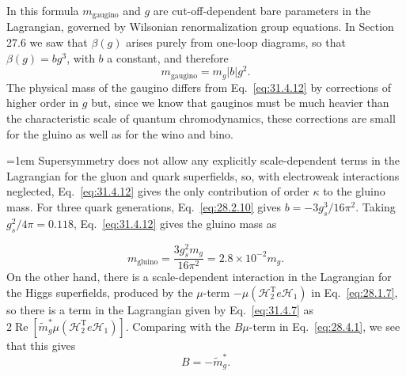 In this formula \(m_{\mathrm{gaugino}}\) and \(g\) are cut-off-dependent
bare parameters in the Lagrangian, governed by Wilsonian renormalization
group equations. In Section 27.6 we saw that \(\beta(g)\) arises purely
from one-loop diagrams, so that \(\beta(g)=bg^3\), with \(b\) a constant,
and therefore
\begin{equation}
  m_{\mathrm{gaugino}}=m_g|b|g^2.
  \tag{31.4.12}\label{eq:31.4.12}
\end{equation}
The physical mass of the gaugino differs from Eq.~\eqref{eq:31.4.12} by
corrections of higher order in \(g\) but, since we know that gauginos must
be much heavier than the characteristic scale of quantum chromodynamics,
these corrections are small for the gluino as well as for the wino and
bino.

\begingroup
\emergencystretch=1em
Supersymmetry does not allow any explicitly scale-dependent terms in the
Lagrangian for the gluon and quark superfields, so, with electroweak
interactions neglected, Eq.~\eqref{eq:31.4.12} gives the only contribution
of order \(\kappa\) to the gluino mass. For three quark generations,
Eq.~\eqref{eq:28.2.10} gives \(b=-3g_s^3/16\pi^2\). Taking
\(g_s^2/4\pi=0.118\), Eq.~\eqref{eq:31.4.12} gives the gluino mass as
\par
\endgroup
\begin{equation}
  m_{\mathrm{gluino}}
  =\frac{3g_s^2m_g}{16\pi^2}
  =2.8\times10^{-2}m_g.
  \tag{31.4.13}\label{eq:31.4.13}
\end{equation}
On the other hand, there is a scale-dependent interaction in the
Lagrangian for the Higgs superfields, produced by the \(\mu\)-term
\(-\mu(\mathcal H_2^{\mathrm T}e\mathcal H_1)\) in
Eq.~\eqref{eq:28.1.7}, so there is a term in the Lagrangian given by
Eq.~\eqref{eq:31.4.7} as
\(2\operatorname{Re}
[\widetilde m_g^*\mu(\mathcal H_2^{\mathrm T}e\mathcal H_1)]\).
Comparing with the \(B\mu\)-term in Eq.~\eqref{eq:28.4.1}, we see that
this gives
\begin{equation}
  B=-\widetilde m_g^*.
  \tag{31.4.14}\label{eq:31.4.14}
\end{equation}

